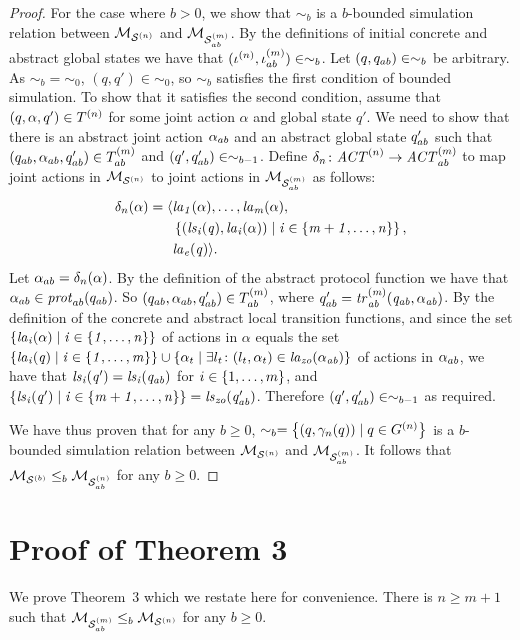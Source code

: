\documentclass{article}
\newenvironment{customthm}[1]
  {\renewcommand\theinnercustomthm{#1}\innercustomthm}
  {\endinnercustomthm}
\begin{document}
\begin{proof}
For the case where $b >0$, 
     we
    show that $\sim_{b}$ is a $b$-bounded simulation relation  between
    $\mathcal{M}_{\mathcal{S}^{(n)}}$ and $\mathcal{M}_{\mathcal{S}_{ab}^{(m)}}$.  By the definitions of initial concrete and
    abstract global states we have that $(\iota^{({n})}, \iota^{({m})}_{ab}) \in
    \sim_{b}$.  Let $(q, q_{ab}) \in \sim_b$ be arbitrary. As $\sim_{b} =
    \sim_0$, $(q, q') \in \sim_0$, so $\sim_{b}$ satisfies the
    first condition of bounded simulation. To show that
    it satisfies the second condition,  assume that $(q, \alpha, q') \in
    T^{(n)}$ for some joint action $\alpha$ and global state $q'$. We need
    to show that there is an abstract joint action $\alpha_{ab}$ and an abstract
    global state $q_{ab}'$ such that $(q_{ab}, \alpha_{ab}, q_{ab}') \in
    T^{(m)}_{ab}$ and $(q', q_{ab}') \in \sim_{b-1}$.  Define $\delta_n \colon
    \mathit{ACT}^{(n)} \rightarrow \mathit{ACT}^{(m)}_{ab}$ to map joint actions in $\mathcal{M}_{\mathcal{S}^{(n)}}$
    to joint actions in $\mathcal{M}_{\mathcal{S}_{ab}^{(m)}}$ as follows:
\begin{align*}
  \delta_n(\alpha) =  \langle &\it{la}_{1}({\alpha}), \ldots, \it{la}_{m}({\alpha}), \\
    &\left \{ (\it{ls}_{i}(q), \it{la}_{i}({\alpha})) \mid i \in \left \{ m + 1, \ldots, n \right \} \right \}, \\
  &\it{la}_{e}({q})  \rangle.
\end{align*}
Let $\alpha_{ab} = \delta_n(\alpha)$. By the definition of the abstract protocol
function we have that $\alpha_{ab} \in \mathit{prot}_{ab}(q_{ab})$. So $(q_{ab},
\alpha_{ab}, q_{ab}') \in T^{(m)}_{ab}$, where $q_{ab}' = \it{tr}^{(m)}_{ab}
(q_{ab}, \alpha_{ab})$. By the definition of the concrete and abstract local
transition functions, and since the set $\left \{ \it{la}_{i}({\alpha}) \mid i \in
\left \{ 1,\ldots,n \right \} \right \}$ of actions in $\alpha$ equals the set $\left \{ \it{la}_{i}({q}) \mid i
\in \left \{ 1,\ldots,m \right \} \right \} \cup \left \{ \alpha_t \mid \exists l_t \colon (l_t, \alpha_t)
\in \it{la}_{zo}({\alpha_{ab}}) \right \}$ of actions in $\alpha_{ab}$, we have that $\it{ls}_{i}(q') =
\it{ls}_{i}(q_{ab})$ for $i \in \left \{ 1,\ldots,m \right \}$, and $\left \{ \it{ls}_{i}(q') \mid i \in
\left \{ m+1,\ldots,n \right \} \right \} = \it{ls}_{zo}(q_{ab}')$.  Therefore $(q', q_{ab}') \in
    \sim_{b-1}$ as required.

We have thus proven that for any $b \geq 0$, $\sim_b = \left \{ (q, \gamma_n(q))
    \mid q \in G^{(n)}  \right \}$ is a $b$-bounded simulation relation between
    $\mathcal{M}_{\mathcal{S}^{(n)}}$ and $\mathcal{M}_{\mathcal{S}_{ab}^{(m)}}$. It follows that $\mathcal{M}_{\mathcal{S}^{(b)}} \leq_b \mathcal{M}_{\mathcal{S}_{ab}^{(n)}}$ for any
    $b \geq 0$.

\end{proof}


\section{Proof of Theorem 3}
We prove Theorem~3 which we restate here for convenience.
\begin{customthm}{3}
There is $n \geq m+1$ such that $\mathcal{M}_{\mathcal{S}_{ab}^{(m)}} \leq_b \mathcal{M}_{\mathcal{S}^{(n)}}$ for any $b \geq 0$.
\end{customthm}
\end{document}
